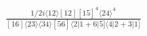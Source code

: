 \documentclass[varwidth, border=5pt]{standalone}
\begin{document}
\begin{my}
$\begin{gathered}
\scriptscriptstyle\frac{1/2i⟨12⟩[12][15]^4⟨24⟩^4}{[16]⟨23⟩⟨34⟩[56]⟨2|1+6|5]⟨4|2+3|1]}
\end{gathered}$
\end{my}
\end{document}
